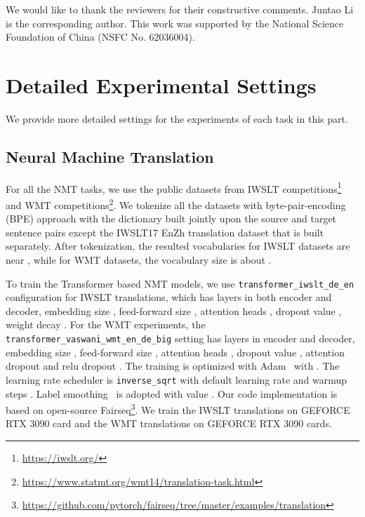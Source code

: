\documentclass{article}
\begin{document}
\begin{ack}
We would like to thank the reviewers for their constructive comments.
Juntao Li is the corresponding author.
This work was supported by the National Science Foundation of China (NSFC No. 62036004).
\end{ack}






\clearpage
\appendix

\section{Detailed Experimental Settings}
\label{sec:experiments_appendix}
We provide more detailed settings for the experiments of each task in this part. 

\subsection{Neural Machine Translation}
For all the NMT tasks, we use the public datasets from IWSLT competitions\footnote{\url{https://iwslt.org/}} and WMT competitions\footnote{\url{https://www.statmt.org/wmt14/translation-task.html}}. We tokenize all the datasets with byte-pair-encoding (BPE) \cite{sennrich2016neural} approach with the dictionary built jointly upon the source and target sentence pairs except the IWSLT17 EnZh translation dataset that is built separately. After tokenization, the resulted vocabularies for IWSLT datasets are near , while for WMT datasets, the vocabulary size is about .

To train the Transformer based NMT models, we use \texttt{transformer\_iwslt\_de\_en} configuration for IWSLT translations, which has  layers in both encoder and decoder, embedding size , feed-forward size , attention heads , dropout value , weight decay . For the WMT experiments, the \texttt{transformer\_vaswani\_wmt\_en\_de\_big} setting has  layers in encoder and decoder, embedding size , feed-forward size , attention heads , dropout value , attention dropout  and relu dropout . The training is optimized with Adam~\cite{kingma2014adam} with . The learning rate scheduler is \texttt{inverse\_sqrt} with default learning rate  and warmup steps . Label smoothing~\cite{szegedy2016rethinking} is adopted with value . Our code implementation is based on open-source Fairseq\footnote{\url{https://github.com/pytorch/fairseq/tree/master/examples/translation}}. We train the IWSLT translations on  GEFORCE RTX 3090 card and the WMT translations on  GEFORCE RTX 3090 cards.
\end{document}
